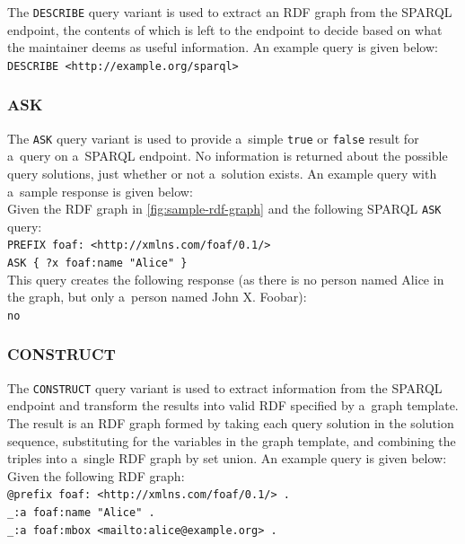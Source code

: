 The \texttt{DESCRIBE} query variant is used to extract
an RDF graph from the SPARQL endpoint,
the contents of which is left to the endpoint to decide
based on what the maintainer deems as useful information.
An example query is given below:\\

\texttt{DESCRIBE <http://example.org/sparql>}

\subsubsection{ASK}

The \texttt{ASK} query variant is used to provide
a~simple \texttt{true} or \texttt{false} result
for a~query on a~SPARQL endpoint.
No information is returned about the possible query solutions,
just whether or not a~solution exists.
An example query with a~sample response is given below:\\

\noindent Given the RDF graph in \autoref{fig:sample-rdf-graph}
and the following SPARQL \texttt{ASK} query:\\

\texttt{PREFIX foaf: <http://xmlns.com/foaf/0.1/>\\
\indent ASK \{ ?x foaf:name  "Alice" \}}\\

\noindent This query creates the following response
(as there is no person named Alice in the graph,
but only a~person named John X. Foobar):\\

\texttt{no}

\subsubsection{CONSTRUCT}

The \texttt{CONSTRUCT} query variant is used to extract
information from the SPARQL endpoint
and transform the results into valid RDF
specified by a~graph template.
The result is an RDF graph formed by taking
each query solution in the solution sequence,
substituting for the variables in the graph template,
and combining the triples into
a~single RDF graph by set union.
An example query is given below:\\

\noindent Given the following RDF graph:\\

\texttt{@prefix foaf: <http://xmlns.com/foaf/0.1/> .}\\
\texttt{\indent \_:a foaf:name "Alice" .}\\
\texttt{\indent \_:a foaf:mbox <mailto:alice@example.org> .}\\

